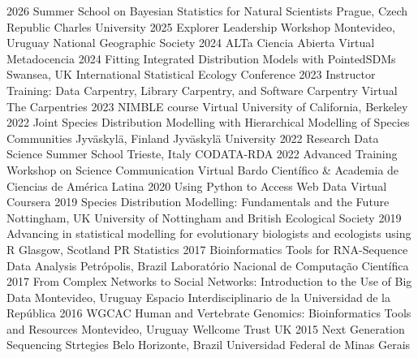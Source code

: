 \documentclass[9pt]{developercv} %
\begin{document}
\hfill




\begin{entrylist}
	\entrylong
		{2026}
		{Summer School on Bayesian Statistics for Natural Scientists}
		{Prague, Czech Republic}
		{Charles University}
	\entrylong
		{2025}
		{Explorer Leadership Workshop}
		{Montevideo, Uruguay}
		{National Geographic Society}
	\entrylong
		{2024}
		{ALTa Ciencia Abierta}
		{Virtual}
		{Metadocencia}
	\entrylong
		{2024}
		{Fitting Integrated Distribution Models with PointedSDMs}
		{Swansea, UK}
		{International Statistical Ecology Conference}
	\entrylong
		{2023}
		{Instructor Training: Data Carpentry, Library Carpentry, and Software Carpentry}
		{Virtual}
		{The Carpentries}
	\entrylong
		{2023}
		{NIMBLE course}
		{Virtual}
		{University of California, Berkeley}
	\entrylong
		{2022}
		{Joint Species Distribution Modelling with Hierarchical Modelling of Species Communities}
		{Jyväskylä, Finland}
		{Jyväskylä University}	
	\entrylong
		{2022}
		{Research Data Science Summer School}
		{Trieste, Italy}
		{CODATA-RDA}	
	\entrylong
		{2022}
		{Advanced Training Workshop on Science Communication}
		{Virtual}
		{Bardo Científico \& Academia de Ciencias de América Latina}	
	\entrylong
		{2020}
		{Using Python to Access Web Data}
		{Virtual}
		{Coursera}	
	\entrylong
		{2019}
		{Species Distribution Modelling: Fundamentals and the Future}
		{Nottingham, UK}
		{University of Nottingham and British Ecological Society}	
	\entrylong
		{2019}
		{Advancing in statistical modelling for evolutionary biologists and ecologists using R}
		{Glasgow, Scotland}
		{PR Statistics}	
	\entrylong
		{2017}
		{Bioinformatics Tools for RNA-Sequence Data Analysis}
		{Petrópolis, Brazil}
		{Laboratório Nacional de Computação Científica}
	\entrylong
		{2017}
		{From Complex Networks to Social Networks: Introduction to the Use of Big Data}
		{Montevideo, Uruguay}
		{Espacio Interdisciplinario de la Universidad de la República}
	\entrylong
		{2016}
		{WGCAC Human and Vertebrate Genomics: Bioinformatics Tools and Resources}
		{Montevideo, Uruguay}
		{Wellcome Trust UK}
	\entrylong
		{2015}
		{Next Generation Sequencing Strtegies}
		{Belo Horizonte, Brazil}
		{Universidad Federal de Minas Gerais}

\end{entrylist}
\end{document}
